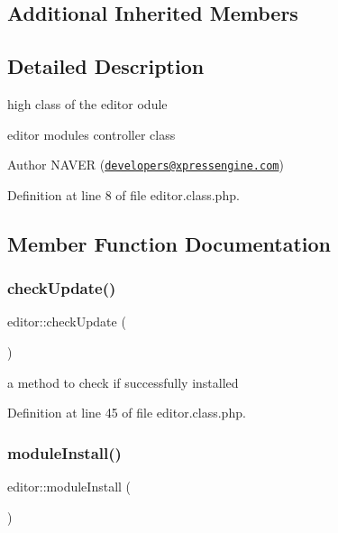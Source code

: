 \subsection*{Additional Inherited Members}


\subsection{Detailed Description}
high class of the editor odule 

editor module\textquotesingle{}s controller class

\begin{DoxyAuthor}{Author}
N\+A\+V\+ER (\href{mailto:developers@xpressengine.com}{\tt developers@xpressengine.\+com}) 
\end{DoxyAuthor}


Definition at line 8 of file editor.\+class.\+php.



\subsection{Member Function Documentation}
\mbox{\label{classeditor_a1247f9114d6c06b321de3b360920364b}} 
\subsubsection{\texorpdfstring{check\+Update()}{checkUpdate()}}
{\footnotesize\ttfamily editor\+::check\+Update (\begin{DoxyParamCaption}{ }\end{DoxyParamCaption})}



a method to check if successfully installed 



Definition at line 45 of file editor.\+class.\+php.

\mbox{\label{classeditor_a4429a1458f38d5005fb611f552ae00e7}} 
\subsubsection{\texorpdfstring{module\+Install()}{moduleInstall()}}
{\footnotesize\ttfamily editor\+::module\+Install (\begin{DoxyParamCaption}{ }\end{DoxyParamCaption})}



